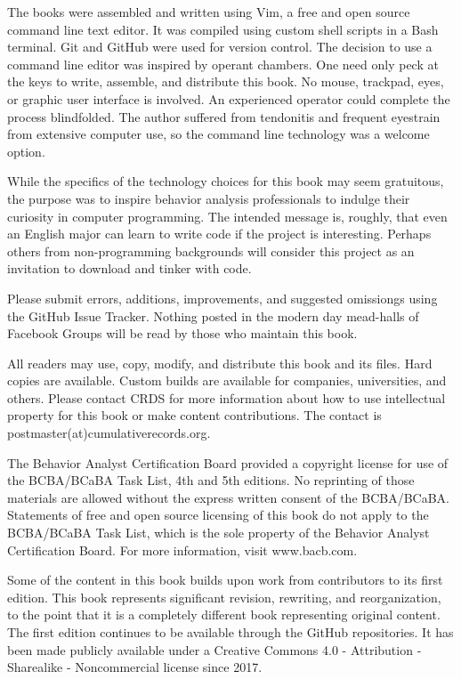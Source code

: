 The books were assembled and written using Vim, a free and open source command line text editor. It was compiled using custom shell scripts in a Bash terminal. Git and GitHub were used for version control. The decision to use a command line editor was inspired by operant chambers. One need only peck at the keys to write, assemble, and distribute this book. No mouse, trackpad, eyes, or graphic user interface is involved. An experienced operator could complete the process blindfolded. The author suffered from tendonitis and frequent eyestrain from extensive computer use, so the command line technology was a welcome option.

While the specifics of the technology choices for this book may seem gratuitous, the purpose was to inspire behavior analysis professionals to indulge their curiosity in computer programming. The intended message is, roughly, that even an English major can learn to write code if the project is interesting. Perhaps others from non-programming backgrounds will consider this project as an invitation to download and tinker with code.

Please submit errors, additions, improvements, and suggested omissiongs using the GitHub Issue Tracker. Nothing posted in the modern day mead-halls of Facebook Groups will be read by those who maintain this book.

All readers may use, copy, modify, and distribute this book and its files. Hard copies are available. Custom builds are available for companies, universities, and others. Please contact CRDS for more information about how to use intellectual property for this book or make content contributions. The contact is postmaster(at)cumulativerecords.org.

The Behavior Analyst Certification Board provided a copyright license for use of the BCBA/BCaBA Task List, 4th and 5th editions. No reprinting of those materials are allowed without the express written consent of the BCBA/BCaBA. Statements of free and open source licensing of this book do not apply to the BCBA/BCaBA Task List, which is the sole property of the Behavior Analyst Certification Board. For more information, visit www.bacb.com.

Some of the content in this book builds upon work from contributors to its first edition. This book represents significant revision, rewriting, and reorganization, to the point that it is a completely different book representing original content. The first edition continues to be available through the GitHub repositories. It has been made publicly available under a Creative Commons 4.0 - Attribution - Sharealike - Noncommercial license since 2017.
\clearpage
